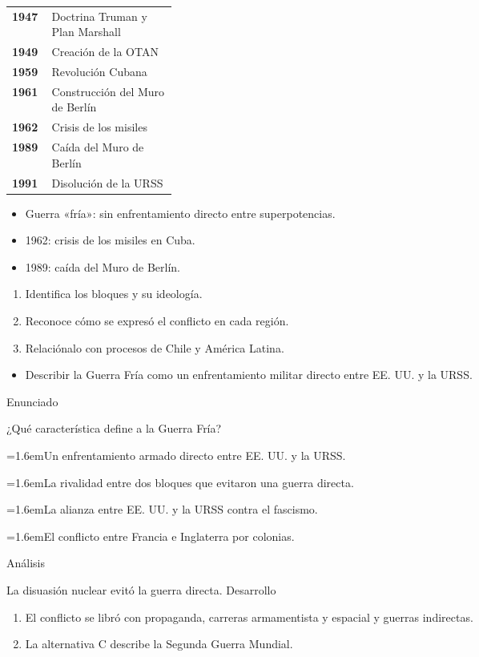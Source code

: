 \documentclass[10pt,a4paper,twocolumn]{article}
\makeatletter
\renewcommand{\arraystretch}{1.18}
\newenvironment{lineatiempo}[1][Línea de tiempo]
  {\begin{tcolorbox}[paes, acento=zinc700, title={#1}]\small\renewcommand{\arraystretch}{1.25}%
   \begin{tabular}{@{}>{\leavevmode\sffamily\bfseries\color{zinc700}}p{0.24\linewidth}p{\dimexpr0.76\linewidth-2\tabcolsep\relax}@{}}}
  {\end{tabular}\end{tcolorbox}}
\newcommand{\alternativa}[2]{\par\noindent\hangindent=1.6em\hangafter=1\makebox[1.6em][l]{\tecla{#1}}#2\par}
\newcommand{\clave}[1]{\par\smallskip{\sffamily\footnotesize\color{esmeralda} Clave \teclaok{#1}}\par}
\makeatother
\begin{document}
\begin{lineatiempo}
1947 & Doctrina Truman y Plan Marshall \\
1949 & Creación de la OTAN \\
1959 & Revolución Cubana \\
1961 & Construcción del Muro de Berlín \\
1962 & Crisis de los misiles \\
1989 & Caída del Muro de Berlín \\
1991 & Disolución de la URSS \\
\end{lineatiempo}

\begin{ideasclave}
\begin{itemize}
  \item Guerra «fría»: sin enfrentamiento directo entre superpotencias.
  \item 1962: crisis de los misiles en Cuba.
  \item 1989: caída del Muro de Berlín.
\end{itemize}
\end{ideasclave}

\begin{metodo}
\begin{enumerate}
  \item Identifica los bloques y su ideología.
  \item Reconoce cómo se expresó el conflicto en cada región.
  \item Relaciónalo con procesos de Chile y América Latina.
\end{enumerate}
\end{metodo}

\begin{errorfrecuente}
\begin{itemize}
  \item Describir la Guerra Fría como un enfrentamiento militar directo entre EE. UU. y la URSS.
\end{itemize}
\end{errorfrecuente}

\begin{ejemplo}
{\sffamily\footnotesize\color{zinc500} Enunciado}\par
¿Qué característica define a la Guerra Fría?
\alternativa{A}{Un enfrentamiento armado directo entre EE. UU. y la URSS.}
\alternativa{B}{La rivalidad entre dos bloques que evitaron una guerra directa.}
\alternativa{C}{La alianza entre EE. UU. y la URSS contra el fascismo.}
\alternativa{D}{El conflicto entre Francia e Inglaterra por colonias.}
\clave{B}
{\sffamily\footnotesize\color{zinc500} Análisis}\par La disuasión nuclear evitó la guerra directa.
{\sffamily\footnotesize\color{zinc500} Desarrollo}
\begin{enumerate}
  \item El conflicto se libró con propaganda, carreras armamentista y espacial y guerras indirectas.
  \item La alternativa C describe la Segunda Guerra Mundial.
\end{enumerate}
\end{ejemplo}
\end{document}
